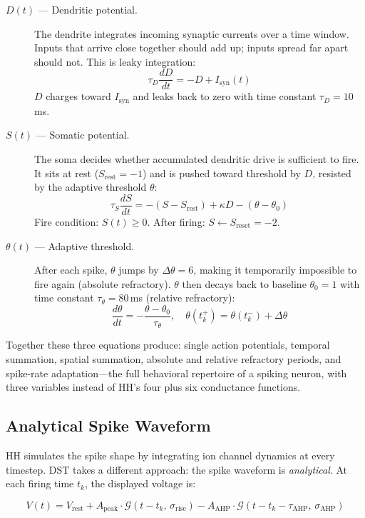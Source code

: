\documentclass[12pt]{article}
\begin{document}
\begin{description}
    \item[$D(t)$ --- Dendritic potential.] The dendrite integrates incoming synaptic currents over a time window. Inputs that arrive close together should add up; inputs spread far apart should not. This is leaky integration:
    \[
    \tau_D \frac{dD}{dt} = -D + I_{\text{syn}}(t)
    \]
    $D$ charges toward $I_{\text{syn}}$ and leaks back to zero with time constant $\tau_D = 10$\,ms.

    \item[$S(t)$ --- Somatic potential.] The soma decides whether accumulated dendritic drive is sufficient to fire. It sits at rest ($S_{\text{rest}} = -1$) and is pushed toward threshold by $D$, resisted by the adaptive threshold $\theta$:
    \[
    \tau_S \frac{dS}{dt} = -(S - S_{\text{rest}}) + \kappa D - (\theta - \theta_0)
    \]
    Fire condition: $S(t) \geq 0$. After firing: $S \leftarrow S_{\text{reset}} = -2$.

    \item[$\theta(t)$ --- Adaptive threshold.] After each spike, $\theta$ jumps by $\Delta\theta = 6$, making it temporarily impossible to fire again (absolute refractory). $\theta$ then decays back to baseline $\theta_0 = 1$ with time constant $\tau_\theta = 80$\,ms (relative refractory):
    \[
    \frac{d\theta}{dt} = -\frac{\theta - \theta_0}{\tau_\theta}, \quad \theta(t_k^+) = \theta(t_k^-) + \Delta\theta
    \]
\end{description}

\noindent Together these three equations produce: single action potentials, temporal summation, spatial summation, absolute and relative refractory periods, and spike-rate adaptation---the full behavioral repertoire of a spiking neuron, with three variables instead of HH's four plus six conductance functions.

\subsection{Analytical Spike Waveform}

HH simulates the spike shape by integrating ion channel dynamics at every timestep. DST takes a different approach: the spike waveform is \textit{analytical}. At each firing time $t_k$, the displayed voltage is:

\[
V(t) = V_{\text{rest}} + A_{\text{peak}} \cdot \mathcal{G}(t - t_k,\, \sigma_{\text{rise}}) - A_{\text{AHP}} \cdot \mathcal{G}(t - t_k - \tau_{\text{AHP}},\, \sigma_{\text{AHP}})
\]
\end{document}
